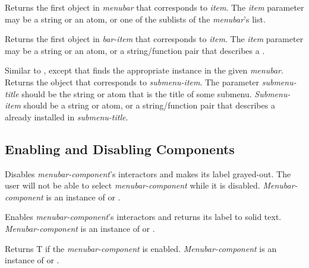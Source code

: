 Returns the first  object in {\it menubar} that corresponds to
{\it item}.  The {\it item} parameter may be a string or an atom, or one of the
sublists of the {\it menubar}'s  list.

Returns the first  object in {\it bar-item} that corresponds to
{\it item}.  The {\it item} parameter may be a string or an atom, or a
string/function pair that describes a .

Similar to , except that 
finds the appropriate  instance in the given {\it menubar}.
Returns the  object that corresponds to {\it submenu-item}.
The parameter {\it submenu-title} should be the string or atom that is the
title of some submenu.  {\it Submenu-item} should be a string or atom, or a
string/function pair that describes a  already installed
in {\it submenu-title}.


\subsection{Enabling and Disabling Components}

Disables {\it menubar-component}'s interactors and makes its label grayed-out.
The user will not be able to select {\it menubar-component} while it is
disabled.   {\it Menubar-component} is an instance of  or
.

Enables {\it menubar-component}'s interactors and returns its label to solid
text.   {\it Menubar-component} is an instance of  or
.

Returns T if the {\it menubar-component} is enabled.  {\it Menubar-component} is
an instance of  or .


